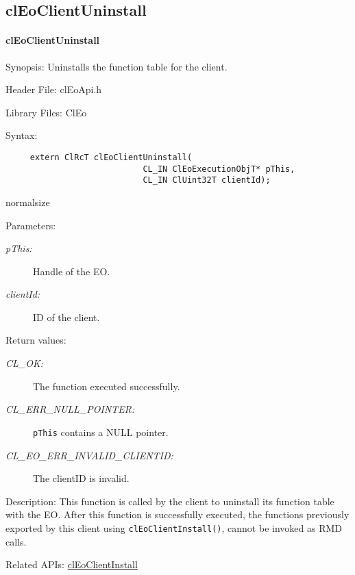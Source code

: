 \begin{flushleft}
  \newpage
\subsection{clEoClientUninstall}
\hypertarget{pageeo107}{}\paragraph{cl\-Eo\-Client\-Uninstall}\label{pageeo107}
\begin{Desc}
\item[Synopsis:]Uninstalls the function table for the client.\end{Desc}
\begin{Desc}
\item[Header File:]clEoApi.h\end{Desc}
\begin{Desc}
\item[Library Files:]Cl\-Eo\end{Desc}
\begin{Desc}
\item[Syntax:]

\footnotesize\begin{verbatim}     extern ClRcT clEoClientUninstall(
                 			CL_IN ClEoExecutionObjT* pThis,
                 			CL_IN ClUint32T clientId);
\end{verbatim}
  normalsize
\end{Desc}
\begin{Desc}
\item[Parameters:]
\begin{description}
\item[{\em p\-This:}]Handle of the EO. 
\item[{\em client\-Id:}]ID of the client.\end{description}
\end{Desc}
\begin{Desc}
\item[Return values:]
\begin{description}
\item[{\em CL\_\-OK:}]The function executed successfully. 
\item[{\em CL\_\-ERR\_\-NULL\_\-POINTER:}]{\tt{pThis}} contains a NULL pointer. 
\item[{\em CL\_\-EO\_\-ERR\_\-INVALID\_\-CLIENTID:}]The client\-ID is invalid.\end{description}
\end{Desc}
\begin{Desc}
\item[Description:]This function is called by the client to uninstall its function table with the EO. After this function is successfully executed,
the functions previously exported by this client using {\tt{cl\-Eo\-Client\-Install()}}, cannot be invoked as RMD calls.
\end{Desc}
\begin{Desc}
\item[Related APIs:]\hyperlink{pageeo106}{cl\-Eo\-Client\-Install} \end{Desc}





\end{flushleft}

